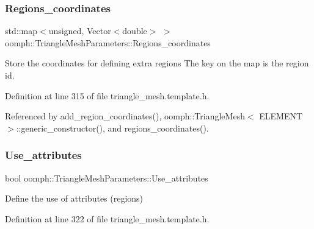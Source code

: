\mbox{\label{classoomph_1_1TriangleMeshParameters_a6c1715f0b7b47ec999766afde7e85d91}} 
\subsubsection{\texorpdfstring{Regions\+\_\+coordinates}{Regions\_coordinates}}
{\footnotesize\ttfamily std\+::map$<$unsigned, Vector$<$double$>$ $>$ oomph\+::\+Triangle\+Mesh\+Parameters\+::\+Regions\+\_\+coordinates\hspace{0.3cm}{\ttfamily [protected]}}



Store the coordinates for defining extra regions The key on the map is the region id. 



Definition at line 315 of file triangle\+\_\+mesh.\+template.\+h.



Referenced by add\+\_\+region\+\_\+coordinates(), oomph\+::\+Triangle\+Mesh$<$ E\+L\+E\+M\+E\+N\+T $>$\+::generic\+\_\+constructor(), and regions\+\_\+coordinates().

\mbox{\label{classoomph_1_1TriangleMeshParameters_ace3e9037373f215360c435dc85064db7}} 
\subsubsection{\texorpdfstring{Use\+\_\+attributes}{Use\_attributes}}
{\footnotesize\ttfamily bool oomph\+::\+Triangle\+Mesh\+Parameters\+::\+Use\+\_\+attributes\hspace{0.3cm}{\ttfamily [protected]}}



Define the use of attributes (regions) 



Definition at line 322 of file triangle\+\_\+mesh.\+template.\+h.



